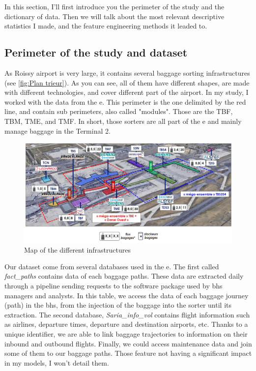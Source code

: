 \documentclass[12pt]{article}
\begin{document}
In this section, I'll first introduce you the perimeter of the study and the dictionary of data. Then we will talk about the most relevant descriptive statistics I made, and the feature engineering methods it leaded to.


\subsection{Perimeter of the study and dataset}

As Roissy airport is very large, it contains several baggage sorting infrastructures (see \autoref{fig:Plan trieur}). As you can see, all of them have different shapes, are made with different technologies, and cover different part of the airport. In my study, I worked with the data from the \acrshort{e}. This perimeter is the one delimited by the red line, and contain sub perimeters, also called "modules". Those are the TBF, TBM, TME, and TMF. In short, those sorters are all part of the \acrshort{e} and mainly manage baggage in the Terminal 2.

\FloatBarrier
\begin{figure}[ht]
    \centering
    \includegraphics[width=\linewidth]{Plan trieur.png}
    \caption{Map of the different infrastructures}
    \label{fig:Plan trieur}
\end{figure}
\FloatBarrier

Our dataset come from several databases used in the \acrshort{e}. The first called \textit{fact\_paths} contains data of each baggage paths. These data are extracted daily through a pipeline sending requests to the software package used by \acrshort{bhs} managers and analysts. In this table, we access the data of each baggage journey (path) in the \acrshort{bhs}, from the injection of the baggage into the sorter until its extraction.
The second database, \textit{Saria\_info\_vol} contains flight information such as airlines, departure times, departure and destination airports, etc. Thanks to a unique identifier, we are able to link baggage trajectories to information on their inbound and outbound flights. Finally, we could access maintenance data and join some of them to our baggage paths. Those feature not having a significant impact in my models, I won't detail them.\hfill \break
\end{document}
